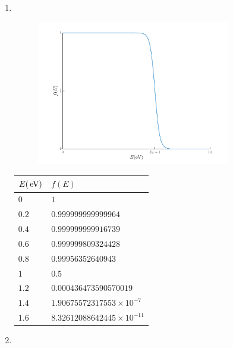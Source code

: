 \documentclass[fleqn, a4paper, 11pt, oneside]{amsart}
\theoremstyle{definition}
\theoremstyle{theorem}
\begin{document}
\begin{solution}
	\begin{enumerate}[leftmargin=*]
		\item
			~\\
			\begin{figure}[H]
				\centering
				\includegraphics[width = 0.8\textwidth]{./fermi_function.pdf}
			\end{figure}
			\begin{table}[H]
				\centering
				\begin{tabular}{l l}
					\toprule
					$E (\electronvolt)$ & $f(E)$                             \\
					\midrule
					$0$                 & $1$                                \\
					$0.2$               & $0.999999999999964$                \\
					$0.4$               & $0.999999999916739$                \\
					$0.6$               & $0.999999809324428$                \\
					$0.8$               & $0.99956352640943$                 \\
					$1$                 & $0.5$                              \\
					$1.2$               & $0.000436473590570019$             \\
					$1.4$               & $1.90675572317553 \times 10^{-7}$  \\
					$1.6$               & $8.32612088642445 \times 10^{-11}$ \\
					\bottomrule
				\end{tabular}
			\end{table}
		\item
			\begin{align*}

\end{align*}
\end{enumerate}
\end{solution}
\end{document}
